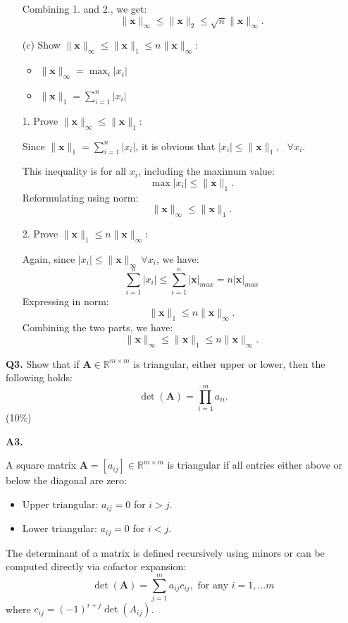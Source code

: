\documentclass[12pt]{article}
\newcommand{\bvec}[1]{\mathbf{#1}} %
\newcommand{\bmat}[1]{\mathbf{#1}} %
\begin{document}
\begin{itemize}
    Combining 1. and 2., we get:
    \[
    \|\mathbf{x}\|_\infty \leq \|\mathbf{x}\|_2 \leq \sqrt{n} \|\mathbf{x}\|_\infty.
    \]

    \item[(c)] Show \( \|\mathbf{x}\|_\infty \leq \|\mathbf{x}\|_1 \leq n \|\mathbf{x}\|_\infty \):

    \begin{itemize}
        \item \( \|\mathbf{x}\|_\infty = \max_{i} |x_i| \)
        \item \( \|\mathbf{x}\|_1 = \sum_{i=1}^n |x_i| \)
    \end{itemize}

    1. Prove \( \|\mathbf{x}\|_\infty \leq \|\mathbf{x}\|_1 \):
    
    Since \( \|\mathbf{x}\|_1 = \sum_{i=1}^n |x_i| \), it is obvious that \( |x_i| \leq \|\mathbf{x}\|_1, 
    \text{ }\forall x_i\).  
    
    This inequality is for all $x_i$, including the maximum value:
    \[
    \max |x_i| \leq \|\mathbf{x}\|_1.
    \]
    Reformulating using norm:
    \[
    \|\bvec{x}\|_{\infty} \leq \|\mathbf{x}\|_1.
    \]
    \vspace{\baselineskip}

    2. Prove \( \|\mathbf{x}\|_1 \leq n \|\mathbf{x}\|_\infty \):
    
    Again, since \( |x_i| \leq \|\mathbf{x}\|_\infty \, \forall x_i \), we have:
    \[
    \sum_{i=1}^n |x_i| \leq \sum_{i=1}^n |\mathbf{x}|_{max} = n |\mathbf{x}|_{max}
    \]
    Expressing in norm:
    \[
    \|\mathbf{x}\|_1 \leq n \|\mathbf{x}\|_\infty.
    \]
    Combining the two parts, we have:
    \[
    \|\mathbf{x}\|_\infty \leq \|\mathbf{x}\|_1 \leq n \|\mathbf{x}\|_\infty.
    \]
\end{itemize}

\vspace{\baselineskip}
\hline
\vspace{\baselineskip}

\textbf{Q3.} Show that if \( \bmat{A} \in \mathbb{R}^{m \times m} \) is triangular, either upper or lower, then the following holds:
\[
\det(\bmat{A}) = \prod_{i=1}^m a_{ii}.
\] \hfill (10\%)
\vspace{\baselineskip}


\textbf{A3.}

A square matrix \( \mathbf{A} = [a_{ij}] \in \mathbb{R}^{m \times m} \) is triangular if all entries either above or below the diagonal are zero:
    \begin{itemize}
        \item Upper triangular: \( a_{ij} = 0 \) for \( i > j \).
        \item Lower triangular: \( a_{ij} = 0 \) for \( i < j \).
    \end{itemize}
 The determinant of a matrix is defined recursively using minors or can be computed directly via cofactor expansion:
    \[
    \det(\mathbf{A}) = \sum_{j=1}^m a_{ij} c_{ij}, \text{ for any } i = 1,...m
    \]
    where \( c_{ij} = (-1)^{i+j} \det (A_{ij})\).
\vspace{\baselineskip}
\end{document}

